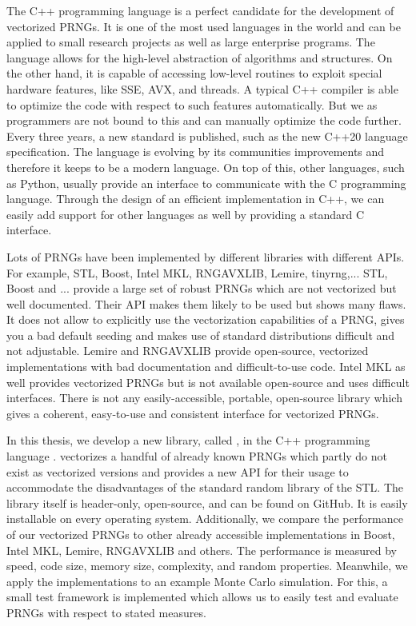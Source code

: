 \documentclass{stdlocal}
\begin{document}
The C++ programming language is a perfect candidate for the development of vectorized PRNGs.
It is one of the most used languages in the world and can be applied to small research projects as well as large enterprise programs.
The language allows for the high-level abstraction of algorithms and structures.
On the other hand, it is capable of accessing low-level routines to exploit special hardware features, like SSE, AVX, and threads.
A typical C++ compiler is able to optimize the code with respect to such features automatically.
But we as programmers are not bound to this and can manually optimize the code further.
Every three years, a new standard is published, such as the new C++20 language specification.
The language is evolving by its communities improvements and therefore it keeps to be a modern language.
On top of this, other languages, such as Python, usually provide an interface to communicate with the C programming language.
Through the design of an efficient implementation in C++, we can easily add support for other languages as well by providing a standard C interface.

Lots of PRNGs have been implemented by different libraries with different APIs.
For example, STL, Boost, Intel MKL, RNGAVXLIB, Lemire, tinyrng,...
STL, Boost and ... provide a large set of robust PRNGs which are not vectorized but well documented.
Their API makes them likely to be used but shows many flaws.
It does not allow to explicitly use the vectorization capabilities of a PRNG, gives you a bad default seeding and makes use of standard distributions difficult and not adjustable.
Lemire and RNGAVXLIB provide open-source, vectorized implementations with bad documentation and difficult-to-use code.
Intel MKL as well provides vectorized PRNGs but is not available open-source and uses difficult interfaces.
There is not any easily-accessible, portable, open-source library which gives a coherent, easy-to-use and consistent interface for vectorized PRNGs.

In this thesis, we develop a new library, called , in the C++ programming language .
 vectorizes a handful of already known PRNGs which partly do not exist as vectorized versions and provides a new API for their usage to accommodate the disadvantages of the standard random library of the STL.
The library itself is header-only, open-source, and can be found on GitHub.
It is easily installable on every operating system.
Additionally, we compare the performance of our vectorized PRNGs to other already accessible implementations in Boost, Intel MKL, Lemire, RNGAVXLIB and others.
The performance is measured by speed, code size, memory size, complexity, and random properties.
Meanwhile, we apply the implementations to an example Monte Carlo simulation.
For this, a small test framework is implemented which allows us to easily test and evaluate PRNGs with respect to stated measures.

\end{document}
